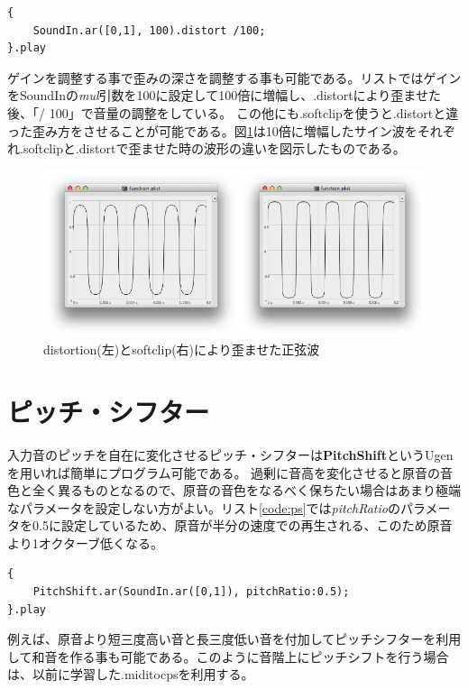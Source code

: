 \documentclass{jsarticle}
\begin{document}
\begin{lstlisting}[caption=ディストーション, label=code:dst]
{
	SoundIn.ar([0,1], 100).distort /100;
}.play
\end{lstlisting}

ゲインを調整する事で歪みの深さを調整する事も可能である。リストではゲインをSoundInの{\it mul}引数を100に設定して100倍に増幅し、.distortにより歪ませた後、「/ 100」で音量の調整をしている。
この他にも.softclipを使うと.distortと違った歪み方をさせることが可能である。図\ref{fig:comparison}は10倍に増幅したサイン波をそれぞれ.softclipと.distortで歪ませた時の波形の違いを図示したものである。

\begin{figure}[ftbp]
	\begin{center}
		\includegraphics[scale=0.6]{comparison.pdf}
	\end{center}
	\caption{distortion(左)とsoftclip(右)により歪ませた正弦波}
	\label{fig:comparison}
\end{figure}

\section{ピッチ・シフター}
入力音のピッチを自在に変化させるピッチ・シフターは{\bf PitchShift}というUgenを用いれば簡単にプログラム可能である。
過剰に音高を変化させると原音の音色と全く異るものとなるので、原音の音色をなるべく保ちたい場合はあまり極端なパラメータを設定しない方がよい。リスト\ref{code:ps}では{\it pitchRatio}のパラメータを0.5に設定しているため、原音が半分の速度での再生される、このため原音より1オクターブ低くなる。

\begin{lstlisting}[caption=ピッチシフター, label=code:ps]
{
	PitchShift.ar(SoundIn.ar([0,1]), pitchRatio:0.5);
}.play
\end{lstlisting}

例えば、原音より短三度高い音と長三度低い音を付加してピッチシフターを利用して和音を作る事も可能である。このように音階上にピッチシフトを行う場合は、以前に学習した.miditocpsを利用する。
\end{document}

